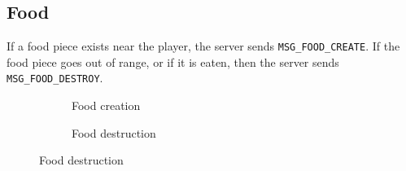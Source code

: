 \subsection{Food}

If a food piece exists near the player, the server sends \verb$MSG_FOOD_CREATE$. If the food piece goes out of range, or if it is eaten, then the server sends \verb$MSG_FOOD_DESTROY$.

\begin{figure}[H]
    \centering
    \begin{subfigure}{.48\linewidth}
        \centering
        
        \caption{Food creation}
    \end{subfigure}
    \begin{subfigure}{.48\linewidth}
        \centering
        
        \caption{Food destruction}
    \end{subfigure}
\end{figure}

\begin{figure}[H]

\end{figure}

\vspace{1.5em}

\begin{figure}[H]

\end{figure}

\vspace{1.5em}

\begin{figure}[H]

\end{figure}

\vspace{1.5em}

\begin{figure}[H]

\end{figure}
